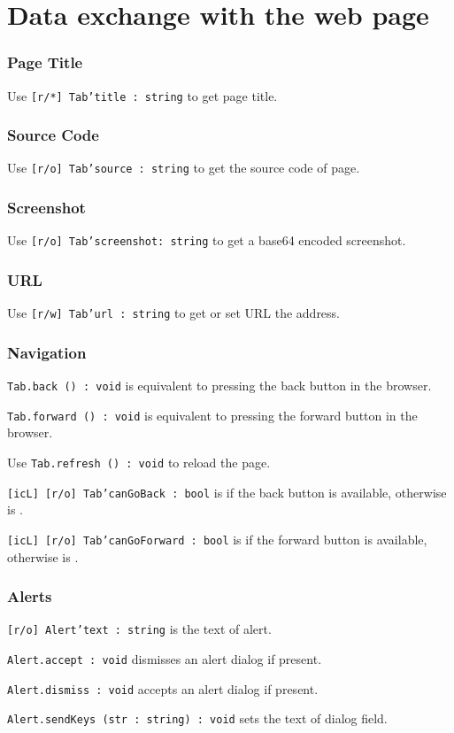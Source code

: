 \section{Data exchange with the web page}
\label{dataexchange}

\subsubsection{Page Title}

Use \texttt{[r/*] Tab'title : string} to get page title.

\subsubsection{Source Code}

Use \texttt{[r/o] Tab'source : string} to get the source code of page.

\subsubsection{Screenshot}

Use \texttt{[r/o] Tab'screenshot: string} to get a base64 encoded screenshot.

\subsubsection{URL}

Use \texttt{[r/w] Tab'url : string} to get or set URL the address.

\subsubsection{Navigation}

\texttt{Tab.back () : void} is equivalent to pressing the back button in the browser.

\texttt{Tab.forward () : void} is equivalent to pressing the forward button in the browser.

Use \texttt{Tab.refresh () : void} to reload the page.

\texttt{[icL] [r/o] Tab'canGoBack : bool} is \true{} if the back button is available, otherwise is \false.

\texttt{[icL] [r/o] Tab'canGoForward : bool} is \true{} if the forward button is available, otherwise is \false.


\subsubsection{Alerts}

\texttt{[r/o] Alert'text : string} is the text of alert.

\texttt{Alert.accept : void} dismisses an alert dialog if present.

\texttt{Alert.dismiss : void} accepts an alert dialog if present.

\texttt{Alert.sendKeys (str : string) : void} sets the text of dialog field.
